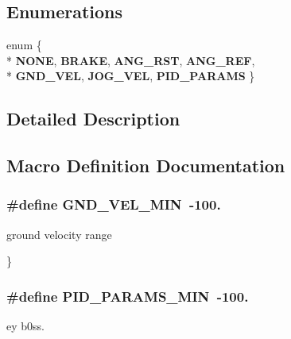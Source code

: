 \subsection*{Enumerations}
\begin{DoxyCompactItemize}
\item 
enum \{ \\*
{\bfseries N\+O\+NE}, 
{\bfseries B\+R\+A\+KE}, 
{\bfseries A\+N\+G\+\_\+\+R\+ST}, 
{\bfseries A\+N\+G\+\_\+\+R\+EF}, 
\\*
{\bfseries G\+N\+D\+\_\+\+V\+EL}, 
{\bfseries J\+O\+G\+\_\+\+V\+EL}, 
{\bfseries P\+I\+D\+\_\+\+P\+A\+R\+A\+MS}
 \}\hypertarget{group__PID_ga06fc87d81c62e9abb8790b6e5713c55b}{}\label{group__PID_ga06fc87d81c62e9abb8790b6e5713c55b}

\end{DoxyCompactItemize}


\subsection{Detailed Description}


\subsection{Macro Definition Documentation}
\subsubsection[{\texorpdfstring{G\+N\+D\+\_\+\+V\+E\+L\+\_\+\+M\+IN}{GND_VEL_MIN}}]{\setlength{\rightskip}{0pt plus 5cm}\#define G\+N\+D\+\_\+\+V\+E\+L\+\_\+\+M\+IN~-\/100.}\hypertarget{group__PID_gabeb0e6ae46e7ac60f0e5436251fd97ed}{}\label{group__PID_gabeb0e6ae46e7ac60f0e5436251fd97ed}


ground velocity range 

\} 
\subsubsection[{\texorpdfstring{P\+I\+D\+\_\+\+P\+A\+R\+A\+M\+S\+\_\+\+M\+IN}{PID_PARAMS_MIN}}]{\setlength{\rightskip}{0pt plus 5cm}\#define P\+I\+D\+\_\+\+P\+A\+R\+A\+M\+S\+\_\+\+M\+IN~-\/100.}\hypertarget{group__PID_ga4be32ff6d05de23e51a9522a957ad8e1}{}\label{group__PID_ga4be32ff6d05de23e51a9522a957ad8e1}
ey b0ss. 